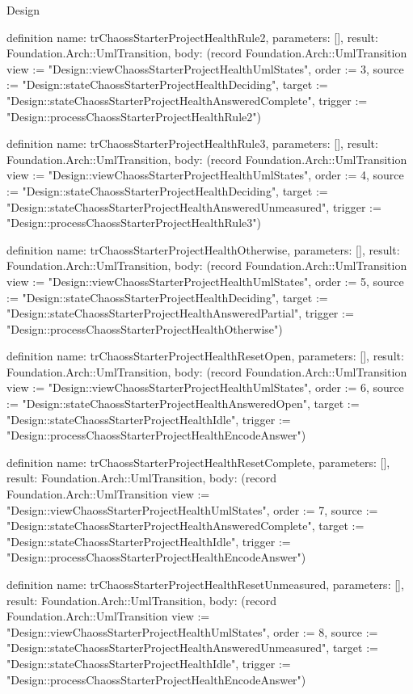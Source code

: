 \begin{lexlean}{Design}
\begin{semanticmodule}
definition{
  name: trChaossStarterProjectHealthRule2,
  parameters: [],
  result: Foundation.Arch::UmlTransition,
  body: (record Foundation.Arch::UmlTransition {view := "Design::viewChaossStarterProjectHealthUmlStates", order := 3, source := "Design::stateChaossStarterProjectHealthDeciding", target := "Design::stateChaossStarterProjectHealthAnsweredComplete", trigger := "Design::processChaossStarterProjectHealthRule2"})
}

definition{
  name: trChaossStarterProjectHealthRule3,
  parameters: [],
  result: Foundation.Arch::UmlTransition,
  body: (record Foundation.Arch::UmlTransition {view := "Design::viewChaossStarterProjectHealthUmlStates", order := 4, source := "Design::stateChaossStarterProjectHealthDeciding", target := "Design::stateChaossStarterProjectHealthAnsweredUnmeasured", trigger := "Design::processChaossStarterProjectHealthRule3"})
}

definition{
  name: trChaossStarterProjectHealthOtherwise,
  parameters: [],
  result: Foundation.Arch::UmlTransition,
  body: (record Foundation.Arch::UmlTransition {view := "Design::viewChaossStarterProjectHealthUmlStates", order := 5, source := "Design::stateChaossStarterProjectHealthDeciding", target := "Design::stateChaossStarterProjectHealthAnsweredPartial", trigger := "Design::processChaossStarterProjectHealthOtherwise"})
}

definition{
  name: trChaossStarterProjectHealthResetOpen,
  parameters: [],
  result: Foundation.Arch::UmlTransition,
  body: (record Foundation.Arch::UmlTransition {view := "Design::viewChaossStarterProjectHealthUmlStates", order := 6, source := "Design::stateChaossStarterProjectHealthAnsweredOpen", target := "Design::stateChaossStarterProjectHealthIdle", trigger := "Design::processChaossStarterProjectHealthEncodeAnswer"})
}

definition{
  name: trChaossStarterProjectHealthResetComplete,
  parameters: [],
  result: Foundation.Arch::UmlTransition,
  body: (record Foundation.Arch::UmlTransition {view := "Design::viewChaossStarterProjectHealthUmlStates", order := 7, source := "Design::stateChaossStarterProjectHealthAnsweredComplete", target := "Design::stateChaossStarterProjectHealthIdle", trigger := "Design::processChaossStarterProjectHealthEncodeAnswer"})
}

definition{
  name: trChaossStarterProjectHealthResetUnmeasured,
  parameters: [],
  result: Foundation.Arch::UmlTransition,
  body: (record Foundation.Arch::UmlTransition {view := "Design::viewChaossStarterProjectHealthUmlStates", order := 8, source := "Design::stateChaossStarterProjectHealthAnsweredUnmeasured", target := "Design::stateChaossStarterProjectHealthIdle", trigger := "Design::processChaossStarterProjectHealthEncodeAnswer"})
}


\end{semanticmodule}
\end{lexlean}
